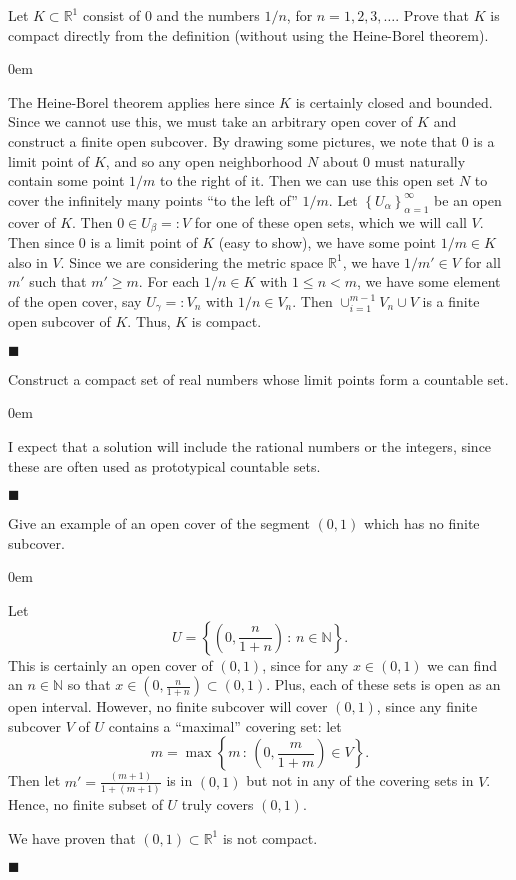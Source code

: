\documentclass[12pt]{article}
\renewcommand{\qed}{\hfill$\blacksquare$}
\renewenvironment{proof}{\begin{addmargin}[1em]{0em}\begin{newproof}}{\end{newproof}\end{addmargin}\qed}
\newenvironment{problem}[2][Exercise]{\begin{trivlist}
\item[\hskip \labelsep {\bfseries #1}\hskip \labelsep {\bfseries #2.}]}{\end{trivlist}}
\begin{document}
\begin{problem}{2.12}
Let $K\subset \mathbb{R}^1$ consist of $0$ and the numbers $1/n$, for $n=1,2,3,\ldots $. Prove that $K$ is compact directly from the definition (without using the Heine-Borel theorem).
\end{problem}
\begin{proof}
{\color{red}The Heine-Borel theorem applies here since $K$ is certainly closed and bounded. Since we cannot use this, we must take an arbitrary open cover of $K$ and construct a finite open subcover. By drawing some pictures, we note that $0$ is a limit point of $K$, and so any open neighborhood $N$ about $0$ must naturally contain some point $1/m$ to the right of it. Then we can use this open set $N$ to cover the infinitely many points ``to the left of'' $1/m$. } Let $\left\{U_{\alpha}\right\}_{\alpha =1}^{\infty}$ be an open cover of $K$. Then $0\in U_{\beta}=:V $ for one of these open sets, which we will call $V$. Then since $0$ is a limit point of $K$ {\color{red}(easy to show)}, we have some point $1/m \in K$ also in $V$. Since we are considering the metric space $\mathbb{R}^1$, we have $1/m' \in V$ for all $ m' $ such that $m' \geq m$. For each $1/n \in K$ with $1\leq n < m$, we have some element of the open cover, say $U_{\gamma}=:V_n$ with $1/n \in V_n$. Then $\cup_{i=1}^{m-1} V_n \cup V $ is a finite open subcover of $K$. Thus, $K$ is compact.
\end{proof}



\begin{problem}{2.13}
Construct a compact set of real numbers whose limit points form a countable set.
\end{problem}
\begin{proof}
{\color{red}I expect that a solution will include the rational numbers or the integers, since these are often used as prototypical countable sets.}
\end{proof}




\begin{problem}{2.14}
Give an example of an open cover of the segment $\left(0,1\right)$ which has no finite subcover.
\end{problem}
\begin{proof}
Let $$U=\left\{ \left(0,\frac{n}{1+n}\right) \, : \, n\in \mathbb{N} \right\}. $$ This is certainly an open cover of $\left(0,1\right)$, since for any $x\in\left(0,1\right)$ we can find an $n \in \mathbb{N}$ so that $x \in \left(0, \frac{n}{1+n}\right) \subset \left(0,1\right)$. Plus, each of these sets is open as an open interval. However, no finite subcover will cover $\left(0,1\right)$, since any finite subcover $V$ of $U$ contains a ``maximal'' covering set: let $$ m = \max \left\{ m\, : \, \left(0,\frac{m}{1+m}\right)\in V \right\}. $$ Then let $m' = \frac{\left(m+1\right)}{1+\left(m+1\right)}$ is in $\left(0,1\right)$ but not in any of the covering sets in $V$. Hence, no finite subset of $U$ truly covers $\left(0,1\right)$.

We have proven that $\left(0,1\right)\subset \mathbb{R}^1$ is not compact.
\end{proof}
\end{document}
